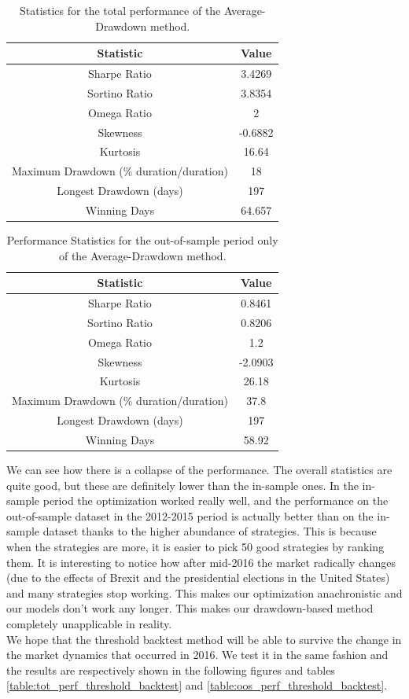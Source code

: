 \begin{table}
	\centering
	\begin{tabular}{c|c}
		\textbf{Statistic} & \textbf{Value} \\\hline
		Sharpe Ratio & 3.4269 \\ 
		Sortino Ratio & 3.8354 \\ 
		Omega Ratio & 2 \\ 
		Skewness & -0.6882 \\ 
		Kurtosis & 16.64 \\ 
		Maximum Drawdown (\% duration/duration) & 18 \\ 
		Longest Drawdown (days) & 197 \\ 
		Winning Days & 64.657 \\ 
	\end{tabular}
	\caption{\label{table:tot_perf_av_drawdown} Statistics for the total performance of the Average-Drawdown method.}
\end{table}


\begin{table}
	\centering
	\begin{tabular}{c|c}
		\textbf{Statistic} & \textbf{Value} \\\hline
		Sharpe Ratio & 0.8461 \\ 
		Sortino Ratio & 0.8206 \\ 
		Omega Ratio & 1.2 \\ 
		Skewness & -2.0903 \\ 
		Kurtosis & 26.18 \\ 
		Maximum Drawdown (\% duration/duration) & 37.8 \\ 
		Longest Drawdown (days) & 197 \\ 
		Winning Days & 58.92 \\ 
	\end{tabular}
	\label{table:oos_perf_av_drawdown}
	\caption{\label{table:oos_perf_av_drawdown} Performance Statistics for the out-of-sample period only of the Average-Drawdown method.}
\end{table}

We can see how there is a collapse of the performance. The overall statistics are quite good, but these are definitely lower than the in-sample ones. In the in-sample period the optimization worked really well, and the performance on the out-of-sample dataset in the 2012-2015 period is actually better than on the in-sample dataset thanks to the higher abundance of strategies. This is because when the strategies are more, it is easier to pick 50 good strategies by ranking them. It is interesting to notice how after mid-2016 the market radically changes (due to the effects of Brexit and the presidential elections in the United States) and many strategies stop working. This makes our optimization anachronistic and our models don't work any longer. This makes our drawdown-based method completely unapplicable in reality.\\
We hope that the threshold backtest method will be able to survive the change in the market dynamics that occurred in 2016. We test it in the same fashion and the results are respectively shown in the following figures and tables \ref{table:tot_perf_threshold_backtest} and \ref{table:oos_perf_threshold_backtest}.

